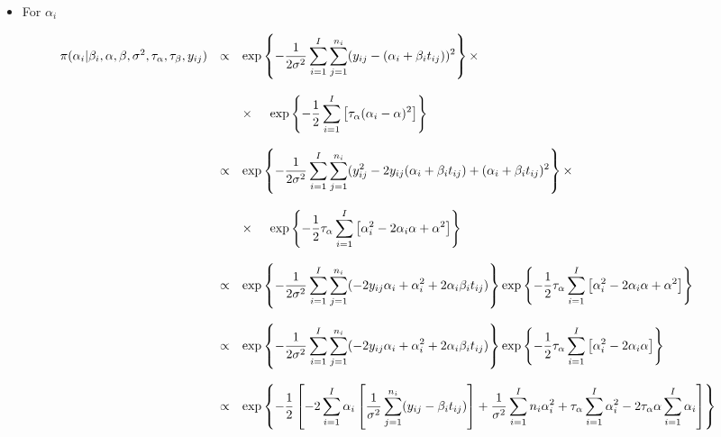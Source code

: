 \documentclass{article}
\begin{document}
\begin{itemize}
\item For $\alpha_i$
\end{itemize}
\begin{equation*}
\begin{array}{lcl ll }

\pi(\alpha_i|\beta_i, \alpha, \beta, \sigma^2, \tau_\alpha, \tau_\beta, y_{ij}) & \propto & \mbox{exp}\left\{ - \dfrac{1}{2\sigma^2}\displaystyle\sum_{i=1}^{I}\displaystyle\sum_{j=1}^{n_i}(y_{ij} - (\alpha_i + \beta_i t_{ij}))^2\right\} \times \\ \\

& & \times \hspace{0.5cm} \mbox{exp}\left\{ - \dfrac{1}{2} 
\displaystyle\sum_{i=1}^{I} \left[ \tau_{\alpha}(\alpha_{i} - \alpha)^2 \right]\right\} \\ \\

& \propto & \mbox{exp}\left\{ - \dfrac{1}{2\sigma^2}\displaystyle\sum_{i=1}^{I}\displaystyle\sum_{j=1}^{n_i}(y_{ij}^2 -2y_{ij}(\alpha_i + \beta_i t_{ij}) + (\alpha_i + \beta_i t_{ij})^2\right\} \times \\ \\

& & \times \hspace{0.5cm} \mbox{exp}\left\{ - \dfrac{1}{2} \tau_{\alpha}
\displaystyle\sum_{i=1}^{I} \left[\alpha_{i}^2 -2\alpha_{i}\alpha + \alpha^2 \right]\right\} \\ \\

& \propto & \mbox{exp}\left\{ - \dfrac{1}{2\sigma^2}\displaystyle\sum_{i=1}^{I}\displaystyle\sum_{j=1}^{n_i}( -2y_{ij}\alpha_i + \alpha_i^2 + 2\alpha_i\beta_i t_{ij})\right\} \mbox{exp}\left\{ - \dfrac{1}{2} \tau_{\alpha}
\displaystyle\sum_{i=1}^{I} \left[\alpha_{i}^2 -2\alpha_{i}\alpha + \alpha^2 \right]\right\} \\ \\

& \propto & \mbox{exp}\left\{ - \dfrac{1}{2\sigma^2}\displaystyle\sum_{i=1}^{I}\displaystyle\sum_{j=1}^{n_i}( -2y_{ij}\alpha_i + \alpha_i^2 + 2\alpha_i\beta_i t_{ij})\right\}  \mbox{exp}\left\{ - \dfrac{1}{2} \tau_{\alpha}
\displaystyle\sum_{i=1}^{I} \left[\alpha_{i}^2 -2\alpha_{i}\alpha  \right]\right\} \\ \\


& \propto & \mbox{exp}\left\{ - \dfrac{1}{2} \left[ -2 \displaystyle\sum_{i=1}^{I} \alpha_i \left[ \dfrac{1}{\sigma^2}\displaystyle\sum_{j=1}^{n_i}( y_{ij} - \beta_i t_{ij}) \right] + \dfrac{1}{\sigma^2} \displaystyle\sum_{i=1}^{I} n_i\alpha_i^2 + \tau_{\alpha} \displaystyle\sum_{i=1}^{I} \alpha_i^2 - 2\tau_{\alpha} \alpha \displaystyle\sum_{i=1}^{I} \alpha_{i}\right]\right\} \\ \\


\end{array}
\end{equation*}
\end{document}
